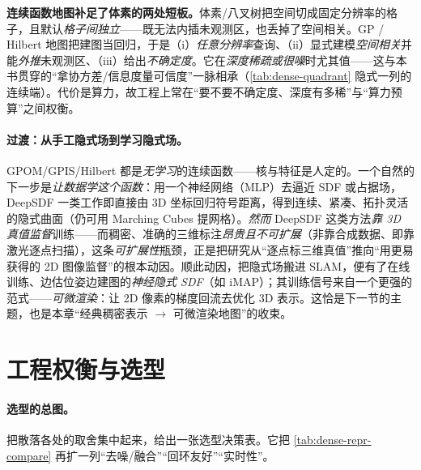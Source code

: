 \begin{insight}
\textbf{连续函数地图补足了体素的两处短板。}体素/八叉树把空间切成固定分辨率的格子，且默认\emph{格子间独立}——既无法内插未观测区，也丢掉了空间相关。GP / Hilbert 地图把建图当回归，于是（i）\emph{任意分辨率}查询、（ii）显式建模\emph{空间相关}并能\emph{外推}未观测区、（iii）给出\emph{不确定度}。它在\emph{深度稀疏或很噪}时尤其值——这与本书贯穿的“拿协方差/信息度量可信度”一脉相承（\cref{tab:dense-quadrant} 隐式一列的连续端）。代价是算力，故工程上常在“要不要不确定度、深度有多稀”与“算力预算”之间权衡。
\end{insight}

\paragraph{过渡：从手工隐式场到学习隐式场。}
GPOM/GPIS/Hilbert 都是\emph{无学习}的连续函数——核与特征是人定的。一个自然的下一步是\emph{让数据学这个函数}：用一个神经网络（MLP）去逼近 SDF 或占据场，DeepSDF\cite{park2019deepsdf} 一类工作即直接由 3D 坐标回归符号距离，得到连续、紧凑、拓扑灵活的隐式曲面（仍可用 Marching Cubes 提网格）。\emph{然而} DeepSDF 这类方法\emph{靠 3D 真值监督}训练——而稠密、准确的三维标注\emph{昂贵且不可扩展}（非靠合成数据、即靠激光逐点扫描），这条\emph{可扩展性}瓶颈，正是把研究从“逐点标三维真值”推向“用更易获得的 2D 图像监督”的根本动因。顺此动因，把隐式场搬进 SLAM，便有了在线训练、边估位姿边建图的\emph{神经隐式 SDF}（如 iMAP\cite{sucar2021imap}）；其训练信号来自一个更强的范式——\emph{可微渲染}：让 2D 像素的梯度回流去优化 3D 表示。这恰是下一节的主题，也是本章“经典稠密表示 $\to$ 可微渲染地图”的收束。

\section{工程权衡与选型}
\label{sec:dense-engineering}

\paragraph{选型的总图。}
把散落各处的取舍集中起来，给出一张选型决策表。它把 \cref{tab:dense-repr-compare} 再扩一列“去噪/融合”“回环友好”“实时性”。

